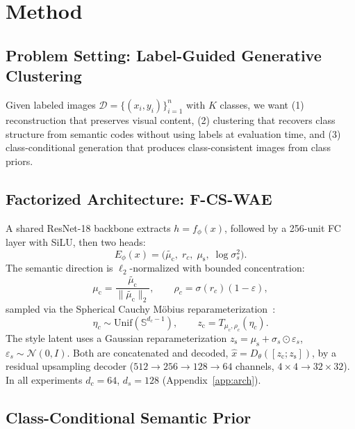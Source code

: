 \documentclass[10pt,letterpaper]{article}
\newcommand{\ours}{F-CS-WAE}
\newcommand{\zc}{z_{\mathrm{c}}}
\newcommand{\zs}{z_{\mathrm{s}}}
\newcommand{\muc}{\mu_{\mathrm{c}}}
\newcommand{\mus}{\mu_{\mathrm{s}}}
\newcommand{\Sph}{\mathbb{S}}
\begin{document}
\section{Method}
\label{sec:method}

\subsection{Problem Setting: Label-Guided Generative Clustering}

Given labeled images $\mathcal{D}=\{(x_i,y_i)\}_{i=1}^n$ with $K$ classes, we
want (1) reconstruction that preserves visual content, (2) clustering that
recovers class structure from semantic codes without using labels at
evaluation time, and (3) class-conditional generation that produces
class-consistent images from class priors.

\subsection{Factorized Architecture: \ours{}}

A shared ResNet-18 backbone extracts $h=f_\phi(x)$, followed by a 256-unit
FC layer with SiLU, then two heads:
\begin{equation}
  E_\phi(x) = \bigl(\tilde{\muc},\;r_c,\;\mus,\;\log\sigma_s^2\bigr).
\end{equation}
The semantic direction is $\ell_2$-normalized with bounded concentration:
\begin{equation}
  \muc = \frac{\tilde{\muc}}{\|\tilde{\muc}\|_2},
  \qquad
  \rho_c = \sigma(r_c)(1-\varepsilon),
  \label{eq:semantic-head}
\end{equation}
sampled via the Spherical Cauchy M\"obius
reparameterization~\citep{sablica2025hyperspherical}:
\begin{equation}
  \eta_c\sim\mathrm{Unif}(\Sph^{d_c-1}),
  \qquad
  \zc = T_{\muc,\rho_c}(\eta_c).
  \label{eq:sc-reparam}
\end{equation}
The style latent uses a Gaussian reparameterization
$\zs=\mus+\sigma_s\odot\varepsilon_s$, $\varepsilon_s\sim\mathcal{N}(0,I)$.
Both are concatenated and decoded, $\hat{x}=D_\theta([\zc;\zs])$, by a
residual upsampling decoder ($512{\to}256{\to}128{\to}64$ channels,
$4\times4\to32\times32$). In all experiments $d_c=64$, $d_s=128$
(Appendix~\ref{app:arch}).

\subsection{Class-Conditional Semantic Prior}
\end{document}
